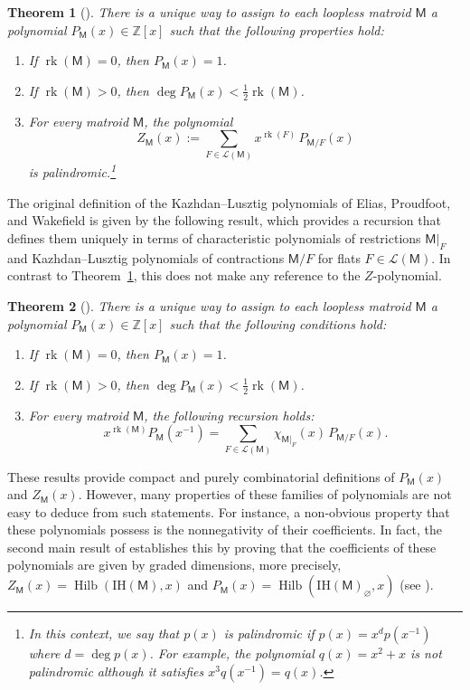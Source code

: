 \documentclass[11pt, a4paper, english]{amsart}
\theoremstyle{teoremas}
\newtheorem{theorem}{Theorem}[section]
\theoremstyle{definition}
\DeclareMathOperator{\rk}{rk}
\newcommand{\M}{\mathsf{M}}
\newcommand{\Z}{\mathbb{Z}}
\newcommand{\Hilb}{\operatorname{Hilb}}
\newcommand{\IH}{\mathrm{IH}}
\begin{document}
\begin{theorem}[{\cite{proudfoot-xu-young,braden-vysogorets}}]\label{thm:definition-kl-and-zeta}
    There is a unique way to assign to each loopless matroid $\M$ a polynomial $P_{\M}(x) \in \Z[x]$ such that the following properties hold:
    \begin{enumerate}[\normalfont(i)]
        \item If $\rk(\M) = 0$, then $P_{\M}(x) = 1$.
        \item If $\rk(\M) > 0$, then $\deg P_{\M}(x) < \frac{1}{2} \rk(\M)$.
        \item For every matroid $\M$, the polynomial
            \[ Z_{\M}(x) := \sum_{F\in \mathcal{L}(\M)} x^{\rk(F)}\, P_{\M/F}(x)\]
        is palindromic.\footnote{In this context, we say that $p(x)$ is palindromic if $p(x) = x^d p(x^{-1})$ where $d = \deg p(x)$. For example, the polynomial $q(x) = x^2+x$ is \emph{not} palindromic although it satisfies $x^3q(x^{-1})=q(x)$.}
    \end{enumerate}
\end{theorem}

The original definition of the Kazhdan--Lusztig polynomials of Elias, Proudfoot, and Wakefield is given by the following result, which provides a recursion that defines them uniquely in terms of characteristic polynomials of restrictions $\M|_F$ and Kazhdan--Lusztig polynomials of contractions $\M/F$ for flats $F\in\mathcal{L}(\M)$. In contrast to Theorem~\ref{thm:definition-kl-and-zeta}, this does not make any reference to the $Z$-polynomial.

\begin{theorem}[\cite{elias-proudfoot-wakefield}]\label{thm:kazhdan-lusztig}
    There is a unique way to assign to each loopless matroid $\M$ a polynomial $P_{\M}(x)\in \mathbb{Z}[x]$ such that the following conditions hold:
    \begin{enumerate}[\normalfont (i)]
        \item If $\rk(\M) = 0$, then $P_{\M}(x) = 1$.
        \item If $\rk(\M) > 0$, then $\deg P_{\M}(x) < \frac{1}{2} \rk(\M)$.
        \item For every matroid $\M$, the following recursion holds:
            \[ x^{\rk(\M)} P_{\M}(x^{-1}) = \sum_{F\in\mathcal{L}(\M)} \chi_{\M|_F}(x)\, P_{\M/F}(x).\]
    \end{enumerate}
\end{theorem}

These results provide compact and purely combinatorial definitions of $P_{\M}(x)$ and $Z_{\M}(x)$. However, many properties of these families of polynomials are not easy to deduce from such statements. For instance, 
a non-obvious property that these polynomials possess is the nonnegativity of their coefficients. In fact, the second main result of \cite{braden-huh-matherne-proudfoot-wang} establishes this by proving that the coefficients of these polynomials are given by graded dimensions, more precisely, $Z_{\M}(x) = \Hilb(\IH(\M), x)$ and $P_{\M}(x) = \Hilb(\IH(\M)_{\varnothing},x) $ (see \cite[Theorem~1.9]{braden-huh-matherne-proudfoot-wang}).
\end{document}
